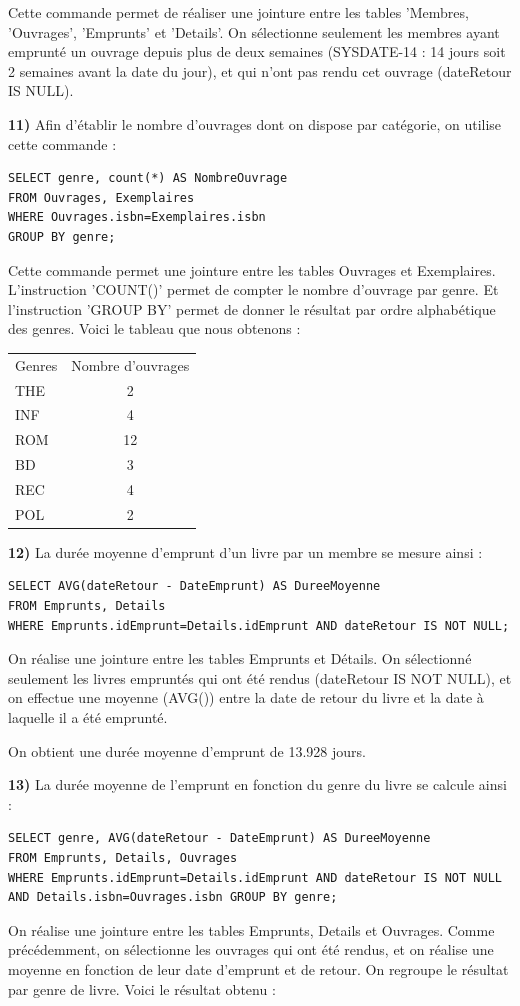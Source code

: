 \documentclass[a4paper,12pt]{article}
\begin{document}
Cette commande permet de réaliser une jointure entre les tables 'Membres, 'Ouvrages', 'Emprunts' et 'Details'. On sélectionne seulement les membres ayant emprunté un ouvrage depuis plus de deux semaines (SYSDATE-14 : 14 jours soit 2 semaines avant la date du jour), et qui n'ont pas rendu cet ouvrage (dateRetour IS NULL). 


  \textbf {11)} Afin d'établir le nombre d’ouvrages dont on dispose par catégorie, on utilise cette commande : 

\begin{lstlisting}
SELECT genre, count(*) AS NombreOuvrage 
FROM Ouvrages, Exemplaires 
WHERE Ouvrages.isbn=Exemplaires.isbn 
GROUP BY genre; 
\end{lstlisting}
 
Cette commande permet une jointure entre les tables Ouvrages et Exemplaires. L'instruction 'COUNT()' permet de compter le nombre d'ouvrage par genre. Et l'instruction 'GROUP BY' permet de donner le résultat par ordre alphabétique des genres. 
\clearpage
Voici le tableau que nous obtenons : 

\begin{tabular}{ l | c }
   Genres & Nombre d'ouvrages \\
   THE & 2 \\
   INF & 4 \\
   ROM & 12 \\
   BD & 3 \\
   REC & 4 \\
   POL & 2 \\
 \end{tabular}

  \textbf {12)} La durée moyenne d’emprunt d’un livre par un membre se mesure ainsi : 
\begin{lstlisting}
SELECT AVG(dateRetour - DateEmprunt) AS DureeMoyenne 
FROM Emprunts, Details 
WHERE Emprunts.idEmprunt=Details.idEmprunt AND dateRetour IS NOT NULL;
\end{lstlisting}

On réalise une jointure entre les tables Emprunts et Détails. On sélectionné seulement les livres empruntés qui ont été rendus (dateRetour IS NOT NULL), et on effectue une moyenne (AVG()) entre la date de retour du livre et la date à laquelle il a été emprunté.

On obtient une durée moyenne d'emprunt de 13.928 jours.  

  \textbf {13)} La durée moyenne de l’emprunt en fonction du genre du livre se calcule ainsi : 
\begin{lstlisting}
SELECT genre, AVG(dateRetour - DateEmprunt) AS DureeMoyenne
FROM Emprunts, Details, Ouvrages 
WHERE Emprunts.idEmprunt=Details.idEmprunt AND dateRetour IS NOT NULL AND Details.isbn=Ouvrages.isbn GROUP BY genre;
\end{lstlisting}
On réalise une jointure entre les tables Emprunts, Details et Ouvrages. Comme précédemment, on sélectionne les ouvrages qui ont été rendus, et on réalise une moyenne en fonction de leur date d'emprunt et de retour. On regroupe le résultat par genre de livre. Voici le résultat obtenu : 
\end{document}

